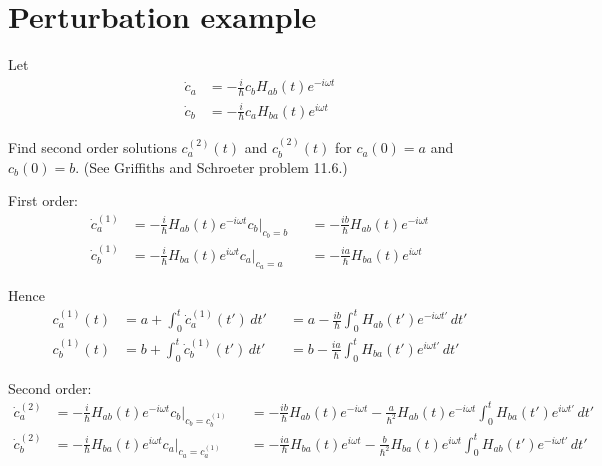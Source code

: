 

\section*{Perturbation example}

Let
\begin{equation*}
\begin{aligned}
\dot c_a&=-\frac{i}{\hbar}c_bH_{ab}(t)e^{-i\omega t}
\\
\dot c_b&=-\frac{i}{\hbar}c_aH_{ba}(t)e^{i\omega t}
\end{aligned}
\end{equation*}

Find second order solutions $c_a^{(2)}(t)$ and $c_b^{(2)}(t)$ for $c_a(0)=a$ and $c_b(0)=b$.
(See Griffiths and Schroeter problem 11.6.)

\bigskip
First order:
\begin{equation*}
\begin{aligned}
\dot c_a^{(1)}&=-\frac{i}{\hbar}H_{ab}(t)e^{-i\omega t}c_b\bigg|_{c_b=b}
&&=-\frac{ib}{\hbar}H_{ab}(t)e^{-i\omega t}
\\
\dot c_b^{(1)}&=-\frac{i}{\hbar}H_{ba}(t)e^{i\omega t}c_a\bigg|_{c_a=a}
&&=-\frac{ia}{\hbar}H_{ba}(t)e^{i\omega t}
\end{aligned}
\tag{1}
\end{equation*}

Hence
\begin{equation*}
\begin{aligned}
c_a^{(1)}(t)&=a+\int_0^t\dot c_a^{(1)}(t')\,dt'
&&=a-\frac{ib}{\hbar}\int_0^tH_{ab}(t')e^{-i\omega t'}\,dt'
\\
c_b^{(1)}(t)&=b+\int_0^t\dot c_b^{(1)}(t')\,dt'
&&=b-\frac{ia}{\hbar}\int_0^tH_{ba}(t')e^{i\omega t'}\,dt'
\end{aligned}
\tag{2}
\end{equation*}

Second order:
\begin{equation*}
\begin{aligned}
\dot c_a^{(2)}&=-\frac{i}{\hbar}H_{ab}(t)e^{-i\omega t}c_b\bigg|_{c_b=c_b^{(1)}}
&&=-\frac{ib}{\hbar}H_{ab}(t)e^{-i\omega t}-\frac{a}{\hbar^2}H_{ab}(t)e^{-i\omega t}
\int_0^tH_{ba}(t')e^{i\omega t'}\,dt'
\\
\dot c_b^{(2)}&=-\frac{i}{\hbar}H_{ba}(t)e^{i\omega t}c_a\bigg|_{c_a=c_a^{(1)}}
&&=-\frac{ia}{\hbar}H_{ba}(t)e^{i\omega t}-\frac{b}{\hbar^2}H_{ba}(t)e^{i\omega t}
\int_0^tH_{ab}(t')e^{-i\omega t'}\,dt'
\end{aligned}
\tag{3}
\end{equation*}

